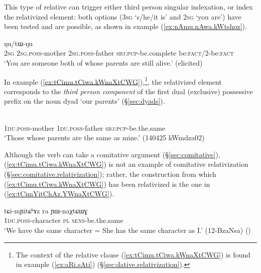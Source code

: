 This type of relative can trigger either third person singular indexation, or index the relativized element: both options (\textsc{3sg}  `s/he/it is' and \textsc{2sg}  `you are') have been tested and are possible, as shown in example (\ref{ex:nAmu.nAwa.kWtshoz}).

\begin{exe}
\ex \label{ex:nAmu.nAwa.kWtshoz}
 ŋu/tɯ-ŋu  \\  
\textsc{2sg} \textsc{2sg}.\textsc{poss}-mother  \textsc{2sg}.\textsc{poss}-father \textsc{sbj}:\textsc{pcp}-be.complete be:\textsc{fact}/2-be:\textsc{fact}  \\
\glt `You are someone both of whose parents are still alive.' (elicited)
\end{exe}

In example (\ref{ex:tCimu.tCiwa.kWnaXtCWG}),\footnote{The context of the relative clause (\ref{ex:tCimu.tCiwa.kWnaXtCWG}) is found in example (\ref{ex:aRi.sAti}) (§\ref{sec:dative.relativization}).}, the relativized element corresponds to the \textit{third person component} of the first dual (exclusive) possessive prefix  on the noun dyad  `our parents' (§\ref{sec:dyads}).
  

\begin{exe}
\ex \label{ex:tCimu.tCiwa.kWnaXtCWG}
 \\
\textsc{1du}.\textsc{poss}-mother  \textsc{1du}.\textsc{poss}-father \textsc{sbj}:\textsc{pcp}-be.the.same \\
\glt `Those whose parents are the same as mine.' (140425 kWmdza02)
\end{exe}

Although the verb  can take a comitative argument (§\ref{sec:comitative}), (\ref{ex:tCimu.tCiwa.kWnaXtCWG}) is not an example of comitative relativization (§\ref{sec:comitative.relativization}); rather, the construction from which (\ref{ex:tCimu.tCiwa.kWnaXtCWG}) has been relativized is the one in (\ref{ex:tCimYitChAz.YWnaXtCWG}).

\begin{exe}
\ex \label{ex:tCimYitChAz.YWnaXtCWG}
\gll tɕi-mɲitɕʰɤz ra ɲɯ-naχtɕɯɣ \\
\textsc{1du}.\textsc{poss}-character \textsc{pl} \textsc{sens}-be.the.same \\
\glt `We have the same character = She has the same character as I.' (12-BzaNsa)
()
\end{exe}


